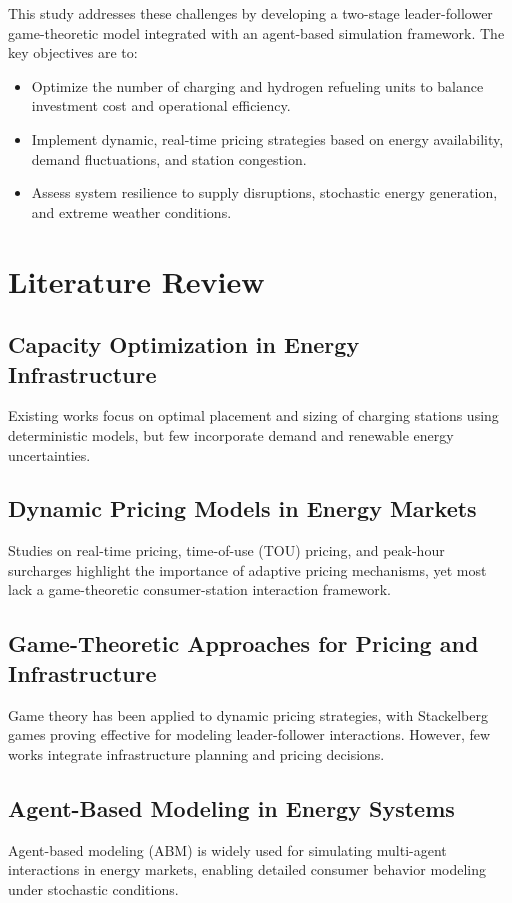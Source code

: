 \documentclass{article}
\begin{document}
This study addresses these challenges by developing a two-stage leader-follower game-theoretic model integrated with an agent-based simulation framework. The key objectives are to:
\begin{itemize}
    \item Optimize the number of charging and hydrogen refueling units to balance investment cost and operational efficiency.
    \item Implement dynamic, real-time pricing strategies based on energy availability, demand fluctuations, and station congestion.
    \item Assess system resilience to supply disruptions, stochastic energy generation, and extreme weather conditions.
\end{itemize}

\section{Literature Review}
\subsection{Capacity Optimization in Energy Infrastructure}
Existing works focus on optimal placement and sizing of charging stations using deterministic models, but few incorporate demand and renewable energy uncertainties.

\subsection{Dynamic Pricing Models in Energy Markets}
Studies on real-time pricing, time-of-use (TOU) pricing, and peak-hour surcharges highlight the importance of adaptive pricing mechanisms, yet most lack a game-theoretic consumer-station interaction framework.

\subsection{Game-Theoretic Approaches for Pricing and Infrastructure}
Game theory has been applied to dynamic pricing strategies, with Stackelberg games proving effective for modeling leader-follower interactions. However, few works integrate infrastructure planning and pricing decisions.

\subsection{Agent-Based Modeling in Energy Systems}
Agent-based modeling (ABM) is widely used for simulating multi-agent interactions in energy markets, enabling detailed consumer behavior modeling under stochastic conditions.
\end{document}
